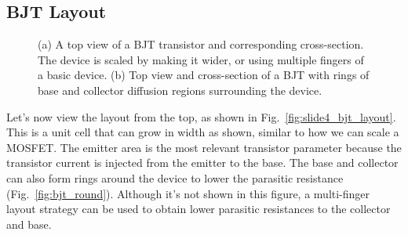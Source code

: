 \subsection{BJT Layout}
\begin{figure}[tb]
\centering
{}
\hspace{1cm}
\caption{(a) A top view of a BJT transistor and corresponding cross-section.  The device is scaled by making it wider, or using multiple fingers of a basic device.  (b) Top view and cross-section of a BJT with rings of base and collector diffusion regions surrounding the device.} 
\end{figure}
Let's now view the layout from the top, as shown in Fig.~\ref{fig:slide4_bjt_layout}.  This is a unit cell that can grow in width as shown, similar to how we can scale a MOSFET.  The emitter area is the most relevant transistor parameter because the transistor current is injected from the emitter to the base.  The base and collector can also form rings around the device to lower the parasitic resistance (Fig.~\ref{fig:bjt_round}).  Although it's not shown in this figure, a multi-finger layout strategy can be used to obtain lower parasitic resistances to the collector and base.  
